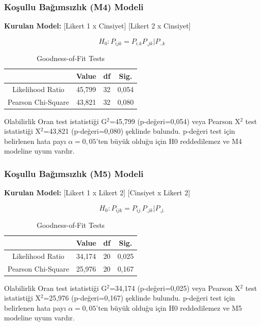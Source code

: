 \documentclass{article}
\begin{document}
\vspace{10pt}
\subsubsection{Koşullu Bağımsızlık (M4) Modeli}
\textbf{Kurulan Model:} [Likert 1 x Cinsiyet] [Likert 2 x Cinsiyet]

$$H_0: P_{ijk} = P_{i.k}P_{.jk}|P_{..k}$$

\begin{table}[h]
    \centering
    \caption{Goodness-of-Fit Tests}
    \begin{tabular}{|c|c|c|c|}
         \hline
          & \textbf{Value} & \textbf{df} & \textbf{Sig.} \\
         \hline
         Likelihood Ratio & 45,799 & 32 & 0,054 \\
         Pearson Chi-Square & 43,821 & 32 & 0,080 \\
         \hline
    \end{tabular}
    \label{tab:goodness-of-fit5}
\end{table}
Olabilirlik Oran test istatistiği G$^2$=45,799 (p-değeri=0,054) veya Pearson X$^2$ test istatistiği X$^2$=43,821 (p-değeri=0,080) şeklinde bulundu. p-değeri test için belirlenen hata payı $\alpha=0,05$'ten büyük olduğu için H0 reddedilemez ve M4 modeline uyum vardır.

\vspace{10pt}
\subsubsection{Koşullu Bağımsızlık (M5) Modeli}
\textbf{Kurulan Model:} [Likert 1 x Likert 2] [Cinsiyet x Likert 2]

$$H_0: P_{ijk} = P_{ij.}P_{.jk}|P_{.j.}$$

\begin{table}[h]
    \centering
    \caption{Goodness-of-Fit Tests}
    \begin{tabular}{|c|c|c|c|}
         \hline
          & \textbf{Value} & \textbf{df} & \textbf{Sig.} \\
         \hline
         Likelihood Ratio & 34,174 & 20 & 0,025 \\
         Pearson Chi-Square & 25,976 & 20 & 0,167 \\
         \hline
    \end{tabular}
    \label{tab:goodness-of-fit6}
\end{table}
Olabilirlik Oran test istatistiği G$^2$=34,174 (p-değeri=0,025) veya Pearson X$^2$ test istatistiği X$^2$=25,976 (p-değeri=0,167) şeklinde bulundu. p-değeri test için belirlenen hata payı $\alpha=0,05$'ten büyük olduğu için H0 reddedilemez ve M5 modeline uyum vardır.
\end{document}

